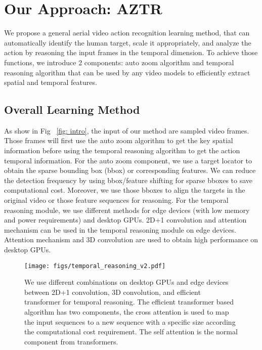 \documentclass[letterpaper, 10 pt, conference]{ieeeconf}
\begin{document}
 \section{Our Approach: AZTR}
\label{sec: method}
We propose a general aerial video action recognition learning method, that can automatically identify the human target, scale it
appropriately, and analyze the action by reasoning the input frames in the temporal dimension. To achieve those functions, we introduce 2 components: auto zoom algorithm and temporal reasoning algorithm that can be used by any video models to efficiently extract spatial and temporal features.

\subsection{Overall Learning Method}
As show in Fig ~\ref{fig: intro}, the input of our method are sampled video frames. Those frames will first use the auto zoom algorithm to get the key spatial information before using the temporal reasoning algorithm to get the action temporal information. 
For the auto zoom component, we use a target locator to obtain the sparse bounding box (bbox) or corresponding features. We can reduce the detection frequency by using bbox/feature shifting for sparse bboxes to save computational cost. Moreover, we use those bboxes to align the targets in the original video or those feature sequences for reasoning. For the temporal reasoning module, we use different methods for edge devices (with low memory and power requirements) and desktop GPUs. 2D+1 convolution and attention mechanism can be used in the temporal reasoning module on edge devices. Attention mechanism and 3D convolution are used to obtain high performance on desktop GPUs.
  
\begin{figure*}[h]
    \centering
        \texttt{[image: figs/temporal\_reasoning\_v2.pdf]}
        \caption{We use different combinations on desktop GPUs and edge devices between 2D+1 convolution, 3D convolution, and efficient transformer for temporal reasoning. The efficient transformer based algorithm has two components, the cross attention is used to map the input sequences to a new sequence with a specific size according the computational cost requirement. The self attention is the normal component from transformers.}
    \label{fig: temporal_reasoning}
\end{figure*}
\end{document}
